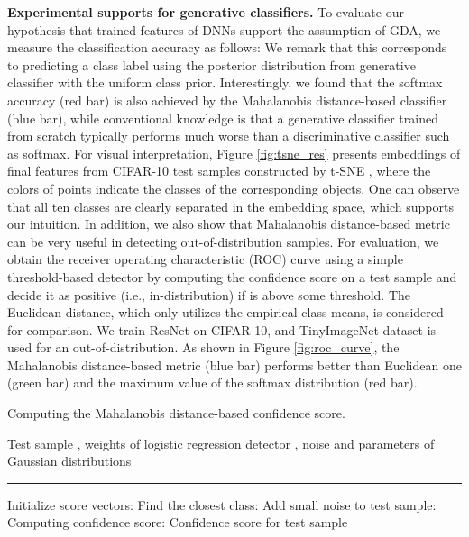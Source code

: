 \documentclass{article}
\begin{document}
{\bf Experimental supports for generative classifiers.}
To evaluate our hypothesis that trained features of DNNs support the assumption of GDA, 
we measure the classification accuracy as follows: 
We remark that this corresponds to predicting a class label using the posterior distribution from generative classifier with the uniform class prior.
Interestingly, 
we found that the softmax accuracy (red bar) is also achieved by the Mahalanobis distance-based classifier (blue bar),
while conventional knowledge is
that a generative classifier trained from scratch typically performs much worse than
a discriminative classifier such as softmax. For visual interpretation,
Figure \ref{fig:tsne_res} presents embeddings of final features from CIFAR-10 test samples constructed by t-SNE \citep{maaten2008visualizing}, where the colors of points indicate the classes of the corresponding objects.
One can observe that all ten classes are clearly separated in the embedding space, 
which supports our intuition.
In addition,
we also show that Mahalanobis distance-based metric can be very useful in detecting out-of-distribution samples.
For evaluation, we obtain the receiver operating characteristic (ROC) curve using a simple threshold-based detector
by computing the confidence score  on a test sample  and decide it as positive (i.e., in-distribution) if  is above some threshold.
The Euclidean distance, which only utilizes the empirical class means, is considered for comparison.
We train ResNet on CIFAR-10, and TinyImageNet dataset \citep{deng2009imagenet} is used for an out-of-distribution.
As shown in Figure \ref{fig:roc_curve}, 
the Mahalanobis distance-based metric (blue bar) performs better than Euclidean one (green bar) and the maximum value of the softmax distribution (red bar).





\begin{algorithm}[t]
\caption{Computing the Mahalanobis distance-based confidence score.} \label{alg:computing_mahalanobis}
\begin{algorithmic}
 Test sample , weights of logistic regression detector , noise  and parameters of Gaussian distributions 
\vspace{0.05in}
\hrule
\vspace{0.05in}
\State Initialize score vectors: 
\State Find the closest class: 
\State Add small noise to test sample:  
\State  Computing confidence score: 
\EndFor
\State \Return Confidence score for test sample {}
\end{algorithmic}
\end{algorithm}
\end{document}
